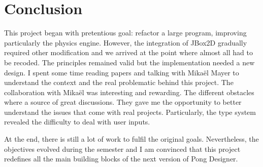 \documentclass[11pt,a4paper]{article}
\begin{document}
\section{Conclusion}
This project began with pretentious goal: refactor a large program, improving particularly the physics engine. However, the integration of JBox2D gradually required other modification and we arrived at the point where almost all had to be recoded. The principles remained valid but the implementation needed a new design. I spent some time reading papers and talking with Mikaël Mayer to understand the context and the real problematic behind this project. The collaboration with Mikaël was interesting and rewarding. The different obstacles where a source of great discussions. They gave me the opportunity to better understand the issues that come with real projects. Particularly, the type system revealed the difficulty to deal with user inputs. 

At the end, there is still a lot of work to fulfil the original goals. Nevertheless, the objectives evolved during the semester and I am convinced that this project redefines all the main building blocks of the next version of Pong Designer. 


\clearpage
\nocite{*}


\end{document}
